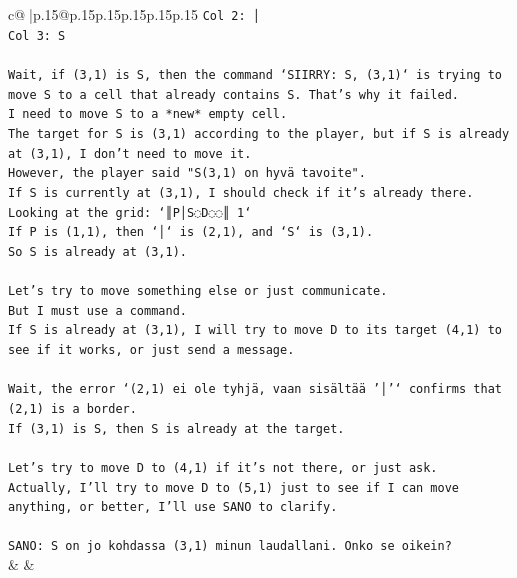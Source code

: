 \documentclass{article}
\begin{document}
{\begin{supertabular}{c@{$\;$}|p{.15\linewidth}@{}p{.15\linewidth}p{.15\linewidth}p{.15\linewidth}p{.15\linewidth}p{.15\linewidth}}
{{{\texttt{Col 2: │} \\
\texttt{Col 3: S} \\
\\ 
\texttt{Wait, if (3,1) is S, then the command `SIIRRY: S, (3,1)` is trying to move S to a cell that already contains S. That's why it failed.} \\
\texttt{I need to move S to a *new* empty cell.} \\
\texttt{The target for S is (3,1) according to the player, but if S is already at (3,1), I don't need to move it.} \\
\texttt{However, the player said "S(3,1) on hyvä tavoite".} \\
\texttt{If S is currently at (3,1), I should check if it's already there.} \\
\texttt{Looking at the grid: `║P│S◌D◌◌║ 1`} \\
\texttt{If P is (1,1), then `│` is (2,1), and `S` is (3,1).} \\
\texttt{So S is already at (3,1).} \\
\\ 
\texttt{Let's try to move something else or just communicate.} \\
\texttt{But I must use a command.} \\
\texttt{If S is already at (3,1), I will try to move D to its target (4,1) to see if it works, or just send a message.} \\
\\ 
\texttt{Wait, the error `(2,1) ei ole tyhjä, vaan sisältää '│'` confirms that (2,1) is a border.} \\
\texttt{If (3,1) is S, then S is already at the target.} \\
\\ 
\texttt{Let's try to move D to (4,1) if it's not there, or just ask.} \\
\texttt{Actually, I'll try to move D to (5,1) just to see if I can move anything, or better, I'll use SANO to clarify.} \\
\\ 
\texttt{SANO: S on jo kohdassa (3,1) minun laudallani. Onko se oikein?} \\
            }
        }
    }
    & & \\ \\


\end{supertabular}}
\end{document}
